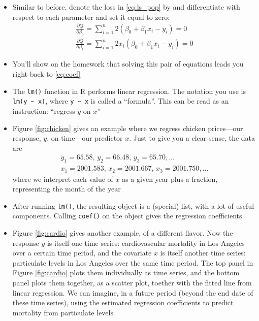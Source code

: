 \documentclass{article}
\begin{document}
\begin{itemize}
\item Similar to before, denote the loss in \eqref{eq:ls_pop} by  and differentiate with
    respect to each parameter and set it equal to zero:
  \begin{gather*}
  \frac{\partial Q}{\partial \beta_0} =  \sum_{i=1}^n 2(\beta_0 + \beta_1 x_i -
  y_i) = 0 \\ 
   \frac{\partial Q}{\partial \beta_1} = \sum_{i=1}^n  2x_i (\beta_0 + \beta_1
   x_i - y_i) = 0  
  \end{gather*}
 
\item You'll show on the homework that solving this pair of equations leads you
  right back to \eqref{eq:coef}

\item The \verb|lm()| function in R performs linear regression. The notation you
  use is \verb|lm(y ~ x)|, where \verb|y ~ x| is called a ``formula''. This can
  be read as an instruction: ``regress $y$  on $x$''    

\item Figure \ref{fig:chicken} gives an example where we regress chicken
  prices---our response, $y$, on time---our predictor $x$. Just to give you a
  clear sense, the data are
  \begin{gather*}
  y_1 = 65.58, \, y_2 = 66.48, \, y_3 = 65.70, \dots \\
  x_1 = 2001.583, \, x_2 = 2001.667, \, x_3 = 2001.750, \dots
  \end{gather*}
  where we interpret each value of $x$ as a given year plus a fraction,
  representing the month of the year
  
\item After running \verb|lm()|, the resulting object is a (special) list, with
  a lot of useful  components. Calling \verb|coef()| on the object gives the
  regression coefficients   

\item Figure \ref{fig:cardio} gives another example, of a different flavor. Now
  the response $y$ is itself one time series: cardiovascular mortality in Los
  Angeles over a certain time period, and the covariate $x$ is itself another
  time series: particulate levels in Los Angeles over the same time period. The 
  top panel in Figure \ref{fig:cardio} plots them individually as time series,
  and the bottom panel plots them together, as a scatter plot, toether with the
  fitted line from linear regression. We can imagine, in a future period (beyond
  the end date of these time series), using the estimated regression
  coefficients to predict mortality from particulate 
  levels  
\end{itemize}
\end{document}
